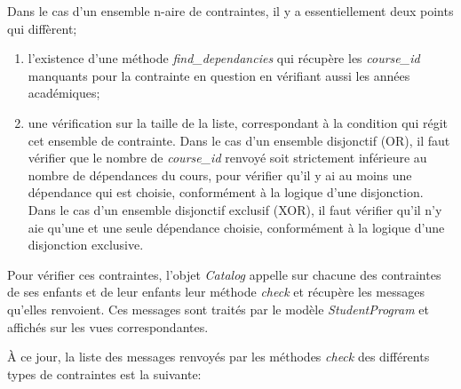 Dans le cas d'un ensemble n-aire de contraintes, il y a essentiellement deux points qui diffèrent;
\begin{enumerate}
  \item l'existence d'une méthode \textit{find\_dependancies} qui récupère les \textit{course\_id} manquants pour la contrainte en question en vérifiant aussi les années académiques;
  \item une vérification sur la taille de la liste, correspondant à la condition qui régit cet ensemble de contrainte. Dans le cas d'un ensemble disjonctif (OR), il faut vérifier que le nombre de \textit{course\_id} renvoyé soit strictement inférieure au nombre de dépendances du cours, pour vérifier qu'il y ai au moins une dépendance qui est choisie, conformément à la logique d'une disjonction. Dans le cas d'un ensemble disjonctif exclusif (XOR), il faut vérifier qu'il n'y aie qu'une et une seule dépendance choisie, conformément à la logique d'une disjonction exclusive.
\end{enumerate}

Pour vérifier ces contraintes, l'objet \textit{Catalog} appelle sur chacune des contraintes de ses enfants et de leur enfants leur méthode \textit{check} et récupère les messages qu'elles renvoient. Ces messages sont traités par le modèle \textit{StudentProgram} et affichés sur les vues correspondantes.

À ce jour, la liste des messages renvoyés par les méthodes \textit{check} des différents types de contraintes est la suivante:

